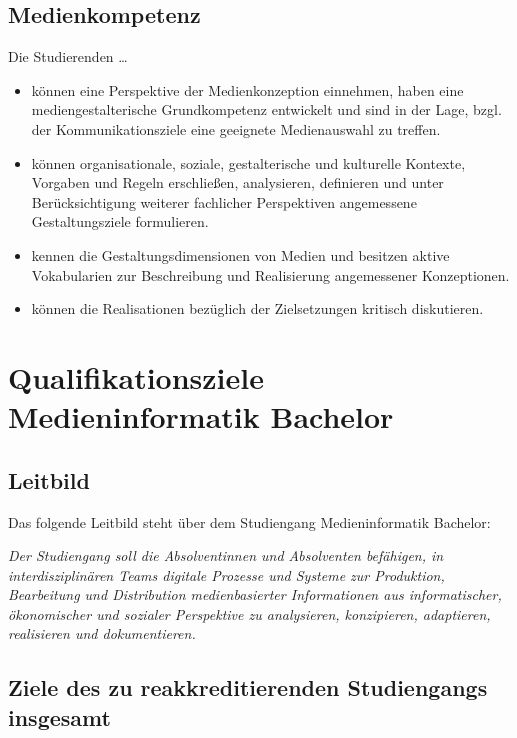 \subsection{Medienkompetenz}\label{medienkompetenz}

Die Studierenden \ldots{}

\begin{itemize}
\tightlist
\item
  können eine Perspektive der Medienkonzeption einnehmen, haben eine
  mediengestalterische Grundkompetenz entwickelt und sind in der Lage,
  bzgl. der Kommunikationsziele eine geeignete Medienauswahl zu treffen.
\item
  können organisationale, soziale, gestalterische und kulturelle
  Kontexte, Vorgaben und Regeln erschließen, analysieren, definieren und
  unter Berücksichtigung weiterer fachlicher Perspektiven angemessene
  Gestaltungsziele formulieren.
\item
  kennen die Gestaltungsdimensionen von Medien und besitzen aktive
  Vokabularien zur Beschreibung und Realisierung angemessener
  Konzeptionen.
\item
  können die Realisationen bezüglich der Zielsetzungen kritisch
  diskutieren.
\end{itemize}

\section{Qualifikationsziele Medieninformatik
Bachelor}\label{qualifikationsziele-medieninformatik-bachelor}

\subsection{Leitbild}\label{leitbild}

Das folgende Leitbild steht über dem Studiengang Medieninformatik
Bachelor:

\emph{Der Studiengang soll die Absolventinnen und Absolventen befähigen,
in interdisziplinären Teams digitale Prozesse und Systeme zur
Produktion, Bearbeitung und Distribution medienbasierter Informationen
aus informatischer, ökonomischer und sozialer Perspektive zu
analysieren, konzipieren, adaptieren, realisieren und dokumentieren.}

\subsection{Ziele des zu reakkreditierenden Studiengangs
insgesamt}\label{ziele-des-zu-reakkreditierenden-studiengangs-insgesamt}

